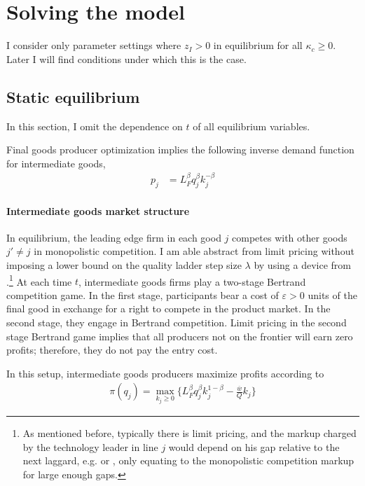 \documentclass[12pt,english]{article}
\theoremstyle{remark}
\begin{document}
\section{Solving the model}

I consider only parameter settings where $z_I > 0$ in equilibrium for all $\kappa_c \ge 0$. Later I will find conditions under which this is the case.

\subsection{Static equilibrium}

In this section, I omit the dependence on $t$ of all equilibrium variables. 

Final goods producer optimization implies the following inverse demand function for intermediate goods, 
\begin{align*}
p_j &= L_F^{\beta} q_j^{\beta} k_j^{-\beta}	
\end{align*}

\paragraph{Intermediate goods market structure} In equilibrium, the leading edge firm in each good $j$ competes with other goods $j' \ne j$ in monopolistic competition. I am able abstract from limit pricing without imposing a lower bound on the quality ladder step size $\lambda$ by using a device from \cite{akcigit_growth_2018}.\footnote{As mentioned before, typically there is limit pricing, and the markup charged by the technology leader in line $j$ would depend on his gap relative to the next laggard, e.g. \cite{baslandze_spinout_2019} or \cite{aghion_competition_2005}, only equating to the monopolistic competition markup for large enough gaps.} At each time $t$, intermediate goods firms play a two-stage Bertrand competition game. In the first stage, participants bear a cost of $\varepsilon > 0$ units of the final good in exchange for a right to compete in the product market. In the second stage, they engage in Bertrand competition. Limit pricing in the second stage Bertrand game implies that all producers not on the frontier will earn zero profits; therefore, they do not pay the entry cost. 

In this setup, intermediate goods producers maximize profits according to
\begin{align}
\pi(q_j) = \max_{k_j \ge 0} \Big\{ L_F^{\beta} q_j^{\beta} k_j^{1-\beta} - \frac{\overline{w}}{Q} k_j \Big\} \label{incumbent_profit}
\end{align}
\end{document}
